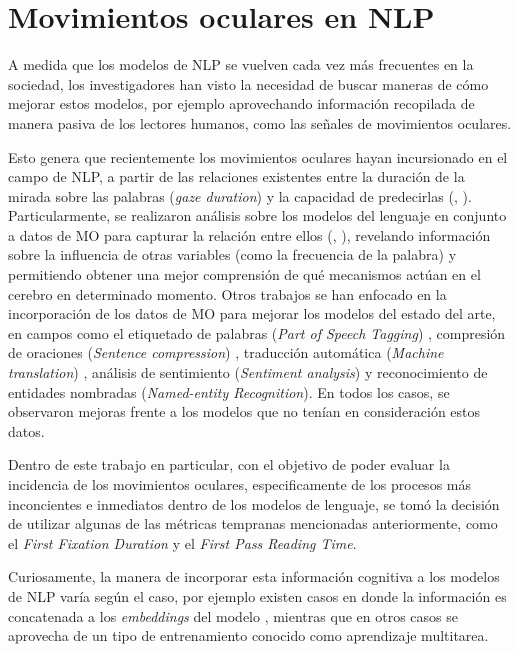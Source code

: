 \section{Movimientos oculares en NLP}

A medida que los modelos de NLP se vuelven cada vez más frecuentes en la sociedad, los investigadores han visto la necesidad de buscar maneras de cómo mejorar estos modelos, por ejemplo aprovechando información recopilada de manera pasiva de los lectores humanos, como las señales de movimientos oculares.

Esto genera que recientemente los movimientos oculares hayan incursionado en el campo de NLP, a partir de las relaciones existentes entre la duración de la mirada sobre las palabras (\textit{gaze duration}) y la capacidad de predecirlas (\cite{Rayner1998}, \cite{Reinhold2006}). Particularmente, se realizaron análisis sobre los modelos del lenguaje en conjunto a datos de MO para capturar la relación entre ellos (\cite{Bianchi2020}, \cite{Hofmann2017}), revelando información sobre la influencia de otras variables (como la frecuencia de la palabra) y permitiendo obtener una mejor comprensión de qué mecanismos actúan en el cerebro en determinado momento. Otros trabajos se han enfocado en la incorporación de los datos de MO para mejorar los modelos del estado del arte, en campos como el etiquetado de palabras (\textit{Part of Speech Tagging}) \parencite{barrett-etal-2016-weakly}, compresión de oraciones (\textit{Sentence compression}) \parencite{klerke2016improvingsentencecompressionlearning}, traducción automática (\textit{Machine translation}) \parencite{sajjad-etal-2016-eyes}, análisis de sentimiento (\textit{Sentiment analysis}) \parencite{mishra2017} y reconocimiento de entidades nombradas (\textit{Named-entity Recognition}). \parencite{hollenstein2019} En todos los casos, se observaron mejoras frente a los modelos que no tenían en consideración estos datos.

Dentro de este trabajo en particular, con el objetivo de poder evaluar la incidencia de los movimientos oculares, especificamente de los procesos más inconcientes e inmediatos dentro de los modelos de lenguaje, se tomó la decisión de utilizar algunas de las métricas tempranas mencionadas anteriormente, como el \textit{First Fixation Duration} y el \textit{First Pass Reading Time}.

Curiosamente, la manera de incorporar esta información cognitiva a los modelos de NLP varía según el caso, por ejemplo existen casos en donde la información es concatenada a los \textit{embeddings} del modelo \parencite{hollenstein2019}, mientras que en otros casos se aprovecha de un tipo de entrenamiento conocido como aprendizaje multitarea. \parencite{klerke2016improvingsentencecompressionlearning}

